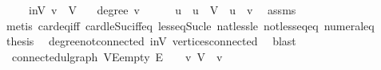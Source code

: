 \begin{isabellebody}
\ \ \ \ \ inV{\isacharcolon}{\kern0pt}\ {\isachardoublequoteopen}v\ {\isasymin}\ V{\isachardoublequoteclose}\isanewline
\ \ \ {\isachardoublequoteopen}degree\ v\ {\isasymnoteq}\ {}{\isachardoublequoteclose}\isanewline
%
\isadelimproof
%
\endisadelimproof
%
\isatagproof
{}\isamarkupfalse%
{\isacharminus}{\kern0pt}\isanewline
\ \ \isamarkupfalse%
\ u\ \ {\isachardoublequoteopen}u\ {\isasymin}\ V{\isachardoublequoteclose}\ \ {\isachardoublequoteopen}u\ {\isasymnoteq}\ v{\isachardoublequoteclose}\ \isamarkupfalse%
\ assms\isanewline
\ \ \ \ \isamarkupfalse%
\ {\isacharparenleft}{\kern0pt}metis\ card{\isacharunderscore}{\kern0pt}eq{\isacharunderscore}{\kern0pt}{}{\isacharunderscore}{\kern0pt}iff\ card{\isacharunderscore}{\kern0pt}le{\isacharunderscore}{\kern0pt}Suc{}{\isacharunderscore}{\kern0pt}iff{\isacharunderscore}{\kern0pt}eq\ less{\isacharunderscore}{\kern0pt}eq{\isacharunderscore}{\kern0pt}Suc{\isacharunderscore}{\kern0pt}le\ nat{\isacharunderscore}{\kern0pt}less{\isacharunderscore}{\kern0pt}le\ not{\isacharunderscore}{\kern0pt}less{\isacharunderscore}{\kern0pt}eq{\isacharunderscore}{\kern0pt}eq\ numeral{\isacharunderscore}{\kern0pt}{}{\isacharunderscore}{\kern0pt}eq{\isacharunderscore}{\kern0pt}{}{\isacharparenright}{\kern0pt}\isanewline
\ \ \isamarkupfalse%
\ \isamarkupfalse%
\ {\isacharquery}{\kern0pt}thesis\ \isamarkupfalse%
\ degree{\isacharunderscore}{\kern0pt}{}{\isacharunderscore}{\kern0pt}not{\isacharunderscore}{\kern0pt}connected\ inV\ vertices{\isacharunderscore}{\kern0pt}connected\ \isamarkupfalse%
\ blast\isanewline
{}\isamarkupfalse%
%
\endisatagproof
{\isafoldproof}%
%
\isadelimproof
\isanewline
%
\endisadelimproof
\isanewline
{}\isamarkupfalse%
\ {\isacharparenleft}{\kern0pt}\ connected{\isacharunderscore}{\kern0pt}ulgraph{\isacharparenright}{\kern0pt}\ V{\isacharunderscore}{\kern0pt}E{\isacharunderscore}{\kern0pt}empty{\isacharcolon}{\kern0pt}\ {\isachardoublequoteopen}E\ {\isacharequal}{\kern0pt}\ {\isacharbraceleft}{\kern0pt}{\isacharbraceright}{\kern0pt}\ {\isasymLongrightarrow}\ {\isasymexists}v{\isachardot}{\kern0pt}\ V\ {\isacharequal}{\kern0pt}\ {\isacharbraceleft}{\kern0pt}v{\isacharbraceright}{\kern0pt}{\isachardoublequoteclose}\isanewline
%
\isadelimproof
\ \ %
\endisadelimproof
%
\isatagproof
{}\isamarkupfalse%

\end{isabellebody}
